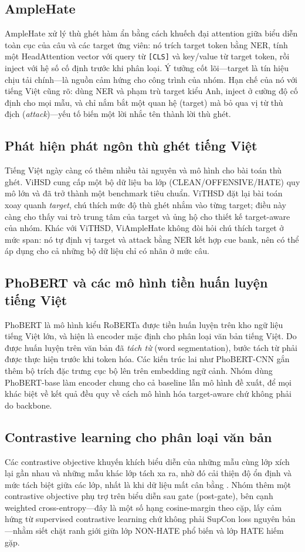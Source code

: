 \documentclass[11pt]{article}
\begin{document}
\subsection{AmpleHate}
AmpleHate \citep{amplehate} xử lý thù ghét hàm ẩn bằng cách khuếch đại attention giữa biểu diễn toàn cục của câu và các target ứng viên: nó trích target token bằng NER, tính một HeadAttention vector với query từ \texttt{[CLS]} và key/value từ target token, rồi inject với hệ số cố định trước khi phân loại. Ý tưởng cốt lõi---target là tín hiệu chịu tải chính---là nguồn cảm hứng cho công trình của nhóm. Hạn chế của nó với tiếng Việt cũng rõ: dùng NER và phạm trù target kiểu Anh, inject ở cường độ cố định cho mọi mẫu, và chỉ nắm bắt một quan hệ (target) mà bỏ qua vị từ thù địch (\emph{attack})---yếu tố biến một lời nhắc tên thành lời thù ghét.

\subsection{Phát hiện phát ngôn thù ghét tiếng Việt}
Tiếng Việt ngày càng có thêm nhiều tài nguyên và mô hình cho bài toán thù ghét. ViHSD \citep{vihsd} cung cấp một bộ dữ liệu ba lớp (CLEAN/OFFENSIVE/HATE) quy mô lớn và đã trở thành một benchmark tiêu chuẩn. ViTHSD \citep{vithsd} đặt lại bài toán xoay quanh \emph{target}, chú thích mức độ thù ghét nhắm vào từng target; điều này càng cho thấy vai trò trung tâm của target và ủng hộ cho thiết kế target-aware của nhóm. Khác với ViTHSD, ViAmpleHate không đòi hỏi chú thích target ở mức span: nó tự định vị target và attack bằng NER kết hợp cue bank, nên có thể áp dụng cho cả những bộ dữ liệu chỉ có nhãn ở mức câu.

\subsection{PhoBERT và các mô hình tiền huấn luyện tiếng Việt}
PhoBERT \citep{phobert} là mô hình kiểu RoBERTa được tiền huấn luyện trên kho ngữ liệu tiếng Việt lớn, và hiện là encoder mặc định cho phân loại văn bản tiếng Việt. Do được huấn luyện trên văn bản đã \emph{tách từ} (word segmentation), bước tách từ phải được thực hiện trước khi token hóa. Các kiến trúc lai như PhoBERT-CNN gắn thêm bộ trích đặc trưng cục bộ lên trên embedding ngữ cảnh. Nhóm dùng PhoBERT-base làm encoder chung cho cả baseline lẫn mô hình đề xuất, để mọi khác biệt về kết quả đều quy về cách mô hình hóa target-aware chứ không phải do backbone.

\subsection{Contrastive learning cho phân loại văn bản}
Các contrastive objective khuyến khích biểu diễn của những mẫu cùng lớp xích lại gần nhau và những mẫu khác lớp tách xa ra, nhờ đó cải thiện độ ổn định và mức tách biệt giữa các lớp, nhất là khi dữ liệu mất cân bằng \citep{supcon}. Nhóm thêm một contrastive objective phụ trợ trên biểu diễn sau gate (post-gate), bên cạnh weighted cross-entropy---đây là một số hạng cosine-margin theo cặp, lấy cảm hứng từ supervised contrastive learning chứ không phải SupCon loss nguyên bản---nhằm siết chặt ranh giới giữa lớp NON-HATE phổ biến và lớp HATE hiếm gặp.
\end{document}
